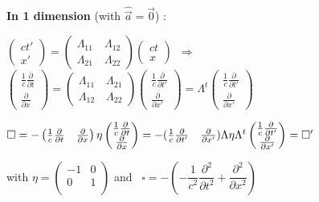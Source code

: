 \item[] \textbf{In 1 dimension} (with $\hat{\vec{a}} = \vec{0}$) : 
\item $\begin{pmatrix}
					ct'\\
					x'
					\end{pmatrix} =
					\begin{pmatrix}
					\Lambda_{11} \quad \Lambda_{12}\\
					\Lambda_{21} \quad \Lambda_{22}
					\end{pmatrix}
					\begin{pmatrix}
					ct\\
					x
					\end{pmatrix}\, $
			        $\Rightarrow$ 	$\begin{pmatrix}
					\frac{1}{c}\frac{\partial}{\partial t}\\
					\frac{\partial}{\partial x} 
					\end{pmatrix} =
					\begin{pmatrix}
					\Lambda_{11} \quad \Lambda_{21}\\
					\Lambda_{12} \quad \Lambda_{22}
					\end{pmatrix}					
					\begin{pmatrix}
					\frac{1}{c}\frac{\partial}{\partial t'}\\
					\frac{\partial}{\partial x'} 
					\end{pmatrix} =	\Lambda^{t}
					\begin{pmatrix}
					\frac{1}{c}\frac{\partial}{\partial t'}\\
					\frac{\partial}{\partial x'} 
					\end{pmatrix}$\\
					
\item $\square 
=-\left( \frac{1}{c} \frac{\partial}{\partial t} \quad \frac{\partial}{\partial x}\right) \eta
    \begin{pmatrix}
        \frac{1}{c}\frac{\partial}{\partial t}\\
	    \frac{\partial}{\partial x} 
	\end{pmatrix}
= -( \frac{1}{c} \frac{\partial }{\partial t'} \quad \frac{\partial }{\partial x'} )
 \Lambda \eta \Lambda^t \begin{pmatrix}
     \frac{1}{c}\frac{\partial }{\partial t'} \\
     \frac{\partial }{\partial x'}
 \end{pmatrix}
 =\square'$
 \item[] 
     with $\eta = 
    \begin{pmatrix}
	     -1 & 0 \\
		  0 & 1 \\
	\end{pmatrix}$ and \ $ \square=-\left( -\dfrac{1}{c^2}\dfrac{\partial^2}{\partial t^2} + \dfrac{\partial^2}{\partial x^2}\right)$ \\


